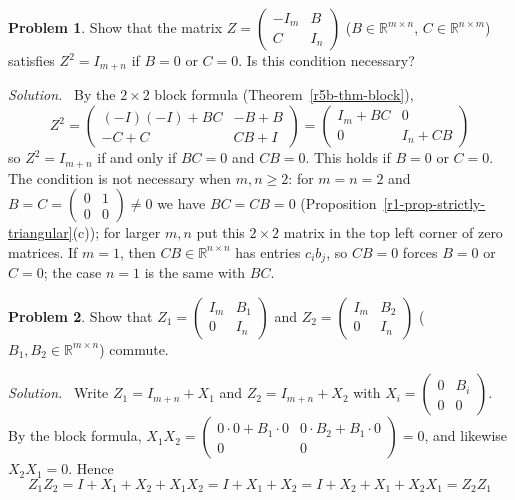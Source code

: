 \documentclass[12pt]{article}
\newcommand{\R}{\mathbb R}
\theoremstyle{definition}
\newtheorem{problem}{Problem}
\newenvironment{solution}{\par\noindent\textit{Solution.}\ }{\par\smallskip}
\begin{document}
\begin{problem}\label{r5b-ex-unipotent}
Show that the matrix
\(Z=\begin{pmatrix}-I_m&B\\C&I_n\end{pmatrix}\) (\(B\in\R^{m\times n}\), \(C\in\R^{n\times m}\))
satisfies \(Z^2=I_{m+n}\) if \(B=0\) or \(C=0\). Is this condition necessary?
\end{problem}
\begin{solution}
By the \(2\times2\) block formula (Theorem~\ref{r5b-thm-block}),
\[
Z^2=\begin{pmatrix}(-I)(-I)+BC&-B+B\\-C+C&CB+I\end{pmatrix}=\begin{pmatrix}I_m+BC&0\\0&I_n+CB\end{pmatrix}
\]
so \(Z^2=I_{m+n}\) if and only if \(BC=0\) and \(CB=0\). This holds if \(B=0\) or \(C=0\).
The condition is not necessary when \(m,n\geqslant2\): for \(m=n=2\) and
\(B=C=\left(\begin{smallmatrix}0&1\\0&0\end{smallmatrix}\right)\ne0\) we have \(BC=CB=0\)
(Proposition~\ref{r1-prop-strictly-triangular}(c)); for larger \(m,n\) put this \(2\times2\) matrix in
the top left corner of zero matrices. If \(m=1\), then \(CB\in\R^{n\times n}\) has entries
\(c_ib_j\), so \(CB=0\) forces \(B=0\) or \(C=0\); the case \(n=1\) is the same with \(BC\).
\end{solution}

\begin{problem}\label{r5b-ex-commuting}
Show that
\(Z_1=\begin{pmatrix}I_m&B_1\\0&I_n\end{pmatrix}\) and
\(Z_2=\begin{pmatrix}I_m&B_2\\0&I_n\end{pmatrix}\) (\(B_1,B_2\in\R^{m\times n}\)) commute.
\end{problem}
\begin{solution}
Write \(Z_1=I_{m+n}+X_1\) and \(Z_2=I_{m+n}+X_2\) with
\(X_i=\left(\begin{smallmatrix}0&B_i\\0&0\end{smallmatrix}\right)\). By the block formula,
\(X_1X_2=\left(\begin{smallmatrix}0\cdot0+B_1\cdot0&0\cdot B_2+B_1\cdot0\\0&0\end{smallmatrix}\right)=0\),
and likewise \(X_2X_1=0\). Hence
\[
Z_1Z_2=I+X_1+X_2+X_1X_2=I+X_1+X_2=I+X_2+X_1+X_2X_1=Z_2Z_1
\]
\end{solution}
\end{document}

